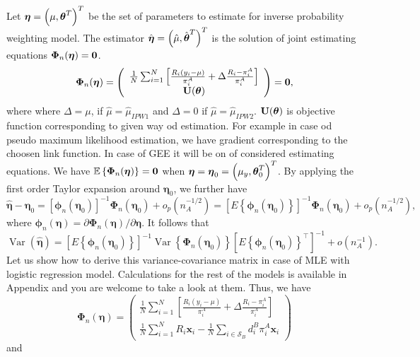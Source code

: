 \documentclass[
  letterpaper,
  DIV=11,
  numbers=noendperiod]{scrreprt}
\begin{document}
Let \(\boldsymbol{\eta} = \left(\mu, \boldsymbol{\theta}^{T}\right)^{T}\) be the set
of parameters to estimate for inverse probability weighting model. The
estimator
\(\hat{\boldsymbol{\eta}} = \left(\hat{\mu}, \hat{\boldsymbol{\theta}}^{T}\right)^{T}\)
is the solution of joint estimating equations
\(\boldsymbol{\Phi}_n(\boldsymbol{\eta}) = \boldsymbol{0}\). \[
\begin{equation}
\boldsymbol{\Phi}_n(\boldsymbol{\eta})=\left(\begin{array}{c}
\frac{1}{N} \sum_{i=1}^N\left[\frac{R_i\left(y_i-\mu\right)}{\pi_i^A}+\Delta \frac{R_i-\pi_i^A}{\pi_i^A}\right] \\
\mathbf{U}(\btheta)
\end{array}\right)=\bZero,
\end{equation}
\] where where \(\Delta = \mu\), if \(\hat{\mu} = \hat{\mu}_{IPW1}\) and
\(\Delta = 0\) if \(\hat{\mu} = \hat{\mu}_{IPW2}\).
\(\mathbf{U}(\boldsymbol{\theta})\) is objective function corresponding to given way
od estimation. For example in case od pseudo maximum likelihood
estimation, we have gradient corresponding to the choosen link function.
In case of GEE it will be on of considered estimating equations. We have
\(\mathbb{E} \left\{\boldsymbol{\Phi}_n(\boldsymbol{\eta})\right\} = \boldsymbol{0}\)
when
\(\boldsymbol{\eta} = \boldsymbol{\eta}_{0} = \left(\mu_y, \boldsymbol{\theta}_0^{T}\right)^{T}\).
By applying the first order Taylor expansion around
\(\boldsymbol{\eta}_0\), we further have \[
\begin{equation*}
\hat{\boldsymbol{\eta}}-\boldsymbol{\eta}_0=\left[\boldsymbol{\phi}_n\left(\boldsymbol{\eta}_0\right)\right]^{-1} \boldsymbol{\Phi}_n\left(\boldsymbol{\eta}_0\right)+o_p\left(n_A^{-1 / 2}\right)=\left[E\left\{\boldsymbol{\phi}_n\left(\boldsymbol{\eta}_0\right)\right\}\right]^{-1} \boldsymbol{\Phi}_n\left(\boldsymbol{\eta}_0\right)+o_p\left(n_A^{-1 / 2}\right),
\end{equation*}
\] where
\(\boldsymbol{\phi}_n(\boldsymbol{\eta})=\partial \boldsymbol{\Phi}_n(\boldsymbol{\eta}) / \partial \boldsymbol{\eta}\).
It follows that \[
\begin{equation}
\operatorname{Var}(\hat{\boldsymbol{\eta}})=\left[E\left\{\boldsymbol{\phi}_n\left(\boldsymbol{\eta}_0\right)\right\}\right]^{-1} \operatorname{Var}\left\{\boldsymbol{\Phi}_n\left(\boldsymbol{\eta}_0\right)\right\}\left[E\left\{\boldsymbol{\phi}_n\left(\boldsymbol{\eta}_0\right)\right\}^{\top}\right]^{-1}+o\left(n_A^{-1}\right).
\end{equation}
\] Let us show how to derive this variance-covariance matrix in case of
MLE with logistic regression model. Calculations for the rest of the
models is available in Appendix and you are welcome to take a look at
them. Thus, we have \[
\boldsymbol{\Phi}_n(\boldsymbol{\eta})=\left(\begin{array}{c}
\frac{1}{N} \sum_{i=1}^N\left[\frac{R_i\left(y_i-\mu\right)}{\pi_i^A}+\Delta \frac{R_i-\pi_i^A}{\pi_i^A}\right] \\
\frac{1}{N} \sum_{i=1}^N R_i \boldsymbol{x}_i-\frac{1}{N} \sum_{i \in \mathcal{S}_B} d_i^B \pi_i^A \boldsymbol{x}_i
\end{array}\right)
\] and
\end{document}
